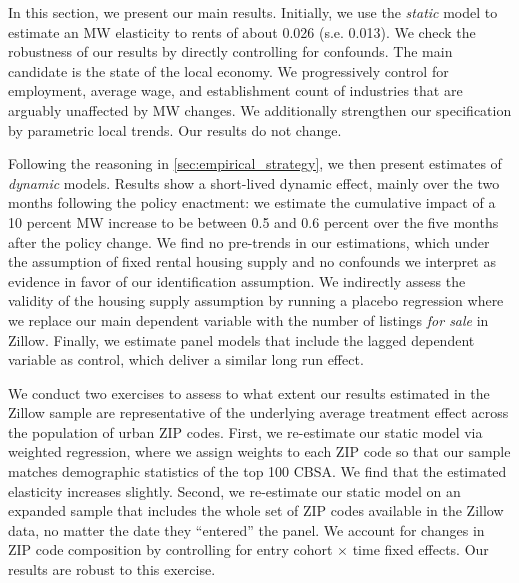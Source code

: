 
In this section, we present our main results. Initially, we use the \textit{static} model
to estimate an MW elasticity to rents of about 0.026 (s.e. 0.013). We check the
robustness of our results by directly controlling for confounds. The main candidate is 
the state of the local economy. We progressively control for employment, average wage, 
and establishment count of industries that are arguably unaffected by MW changes. 
We additionally strengthen our specification by  parametric local trends. Our results do not 
change.

Following the reasoning in \autoref{sec:empirical_strategy}, we then present estimates of 
\textit{dynamic} models. Results show a short-lived dynamic effect, mainly over the two
months following the policy enactment: we estimate the cumulative impact of a 10 percent MW increase 
to be between 0.5 and 0.6 percent over the five months after the policy change. 
We find no pre-trends in our estimations, which under the assumption of fixed rental housing 
supply and no confounds we interpret as evidence in favor of our identification assumption. 
We indirectly assess the validity of the housing supply assumption by running a placebo 
regression where we replace our main dependent variable with the number of listings \textit{for sale} in Zillow. 
Finally, we estimate panel models that include the lagged dependent variable as control,
which deliver a similar long run effect.







We conduct two exercises to assess to what extent our results estimated in the Zillow sample 
are representative of the underlying average treatment effect across the population of urban
ZIP codes. First, we re-estimate our static model via weighted regression, where we assign 
weights to each ZIP code so that our sample matches demographic statistics of the top 100 
CBSA. We find that the estimated elasticity increases slightly. Second, we re-estimate our 
static model on an expanded sample that includes the whole set of ZIP codes available in the 
Zillow data, no matter the date they ``entered'' the panel. We account for changes in ZIP code 
composition by controlling for entry cohort $\times$ time fixed effects. Our results are robust 
to this exercise.

